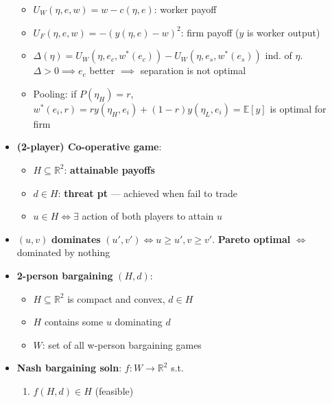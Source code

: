 \documentclass[8pt]{article}
\begin{document}
\begin{multicols*}{3}
\begin{itemize}
\begin{itemize}
                \item $U_W\left(\eta, e, w\right) = w - c\left(\eta, e\right)$: worker payoff
                \item $U_F\left(\eta, e, w\right) = -\left(y\left(\eta, e\right) - w\right)^2$: firm payoff ($y$ is worker output)
                \item $\Delta\left(\eta\right) = U_W\left(\eta, e_c, w^*\left(e_c\right)\right) - U_W\left(\eta, e_s, w^*\left(e_s\right)\right)$ ind. of $\eta$. $\Delta > 0 \implies e_c$ better $\implies$ separation is not optimal
                \item Pooling: if $P\left(\eta_H\right) = r$, $w^*\left(e_i, r\right) = ry\left(\eta_H, e_i\right) + \left(1 - r\right)y\left(\eta_L, e_i\right) = \mathbb{E}\left[y\right]$ is optimal for firm
            \end{itemize}
            \item \textbf{(2-player) Co-operative game}:
            \begin{itemize}
                \setlength\itemsep{0pt}
                \item $H \subseteq \mathbb{R}^2$: \textbf{attainable payoffs}
                \item $d \in H$: \textbf{threat pt} --- achieved when fail to trade
                \item $u \in H \iff \exists$ action of both players to attain $u$
            \end{itemize}
            \item $\left(u, v\right)$ \textbf{dominates} $\left(u', v'\right) \iff u \geq u', v \geq v'$. \textbf{Pareto optimal} $\iff$ dominated by nothing
            \item \textbf{2-person bargaining} $\left(H, d\right)$:
            \begin{itemize}
                \setlength\itemsep{0pt}
                \item $H \subseteq \mathbb{R}^2$ is compact and convex, $d \in H$
                \item $H$ contains some $u$ dominating $d$
                \item $W$: set of all w-person bargaining games
            \end{itemize}
            \item \textbf{Nash bargaining soln}: $f \colon W \to \mathbb{R}^2$ s.t. 
            \begin{enumerate}
                \setlength\itemsep{0pt}
                \item $f\left(H, d\right) \in H$ (feasible)

\end{enumerate}
\end{itemize}
\end{multicols*}
\end{document}
